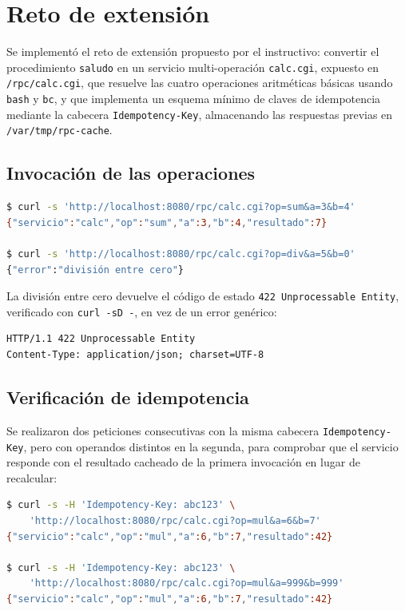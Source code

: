 \section{Reto de extensión}

Se implementó el reto de extensión propuesto por el instructivo: convertir el procedimiento \texttt{saludo} en un servicio multi-operación \texttt{calc.cgi}, expuesto en \texttt{/rpc/calc.cgi}, que resuelve las cuatro operaciones aritméticas básicas usando \texttt{bash} y \texttt{bc}, y que implementa un esquema mínimo de claves de idempotencia mediante la cabecera \texttt{Idempotency-Key}, almacenando las respuestas previas en \texttt{/var/tmp/rpc-cache}.

\subsection*{Invocación de las operaciones}
\begin{lstlisting}[language=bash]
$ curl -s 'http://localhost:8080/rpc/calc.cgi?op=sum&a=3&b=4'
{"servicio":"calc","op":"sum","a":3,"b":4,"resultado":7}

$ curl -s 'http://localhost:8080/rpc/calc.cgi?op=div&a=5&b=0'
{"error":"división entre cero"}
\end{lstlisting}

La división entre cero devuelve el código de estado \texttt{422 Unprocessable Entity}, verificado con \texttt{curl -sD -}, en vez de un error genérico:

\begin{lstlisting}
HTTP/1.1 422 Unprocessable Entity
Content-Type: application/json; charset=UTF-8
\end{lstlisting}

\subsection*{Verificación de idempotencia}

Se realizaron dos peticiones consecutivas con la misma cabecera \texttt{Idempotency-Key}, pero con operandos distintos en la segunda, para comprobar que el servicio responde con el resultado cacheado de la primera invocación en lugar de recalcular:

\begin{lstlisting}[language=bash]
$ curl -s -H 'Idempotency-Key: abc123' \
    'http://localhost:8080/rpc/calc.cgi?op=mul&a=6&b=7'
{"servicio":"calc","op":"mul","a":6,"b":7,"resultado":42}

$ curl -s -H 'Idempotency-Key: abc123' \
    'http://localhost:8080/rpc/calc.cgi?op=mul&a=999&b=999'
{"servicio":"calc","op":"mul","a":6,"b":7,"resultado":42}
\end{lstlisting}

